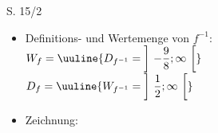 \begin{Exercise}{S. 15/2}{}
\begin{enumerate}
\begin{enumerate}[label=\alph*)]
{\begin{itemize}[leftmargin=*]
{\begin{align*}
                            2 \cdot x &= -\SI{2.25}{} &&| :2\\[1.0ex]
                            x &= -\dfrac{9}{8} &&
                        \end{align*}\\
                        $D_{f^{-1}} = \uuline{W_{f} = \left] \ -\dfrac{9}{8}; \infty \ \right[}$\\
                        }
                    \item Definitions- und Wertemenge von $f^{-1}$: \\[2.0ex]{
                        $W_{f} = \uuline{D_{f^{-1}} = \left] \ -\dfrac{9}{8}; \infty \ \right[}$\\[1.0ex]
                        $D_{f} = \uuline{W_{f^{-1}} = \left] \ \dfrac{1}{2}; \infty \ \right[}$\\[-1.0ex]
                        }
                    \item Zeichnung: \\[-2.0ex]{
                        \begin{minipage}[t]{0.8\linewidth}
\end{minipage}}
\end{itemize}}
\end{enumerate}
\end{enumerate}
\end{Exercise}
